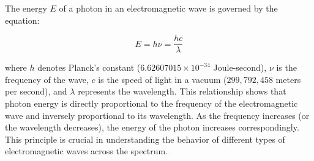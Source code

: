 \documentclass[
  12 pt,
]{Nemilov}
\begin{document}
\begin{table}[!h]
\centering
\caption{\label{tab:emspectrum}Wavelength, frequency, and energy in the em spectrum}
\centering
{}
\end{table}

The energy \(E\) of a photon in an electromagnetic wave is governed by the equation:

\[E = h \nu = \frac{h c}{\lambda}\]

where \(h\) denotes Planck's constant (\(6.62607015 \times 10^{-34}\) Joule-second), \(\nu\) is the frequency of the wave, \(c\) is the speed of light in a vacuum (\(299,792,458\) meters per second), and \(\lambda\) represents the wavelength. This relationship shows that photon energy is directly proportional to the frequency of the electromagnetic wave and inversely proportional to its wavelength. As the frequency increases (or the wavelength decreases), the energy of the photon increases correspondingly. This principle is crucial in understanding the behavior of different types of electromagnetic waves across the spectrum.
\end{document}
